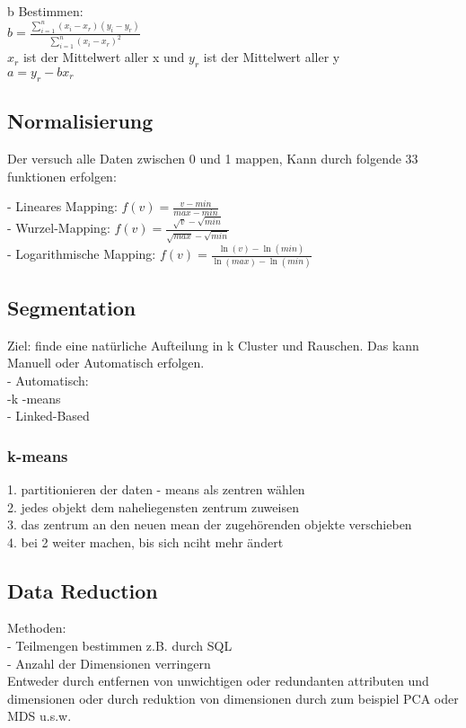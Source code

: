 \documentclass[a4paper]{scrartcl}
\begin{document}
b Bestimmen:\\
$b=\frac{\sum\limits^n_{i=1} (x_i - x_r)(y_i - y_r)}{\sum\limits^n_{i=1}(x_i - x_r)^2}$\\

$x_r$ ist der Mittelwert aller x und $y_r$ ist der Mittelwert aller y\\

$a=y_r - bx_r$\\

\subsection{Normalisierung}
Der versuch alle Daten zwischen 0 und 1 mappen, Kann durch folgende 33 funktionen erfolgen:

- Lineares Mapping: $f(v) = \frac{v-min}{max-min}$\\

- Wurzel-Mapping: $f(v) = \frac{\sqrt{v} - \sqrt{min}}{\sqrt{max}-\sqrt{min}}$\\

- Logarithmische Mapping: $f(v) = \frac{\ln(v)-\ln(min)}{\ln(max)-\ln(min)}$\\

\subsection{Segmentation}
Ziel: finde eine natürliche Aufteilung in k Cluster und Rauschen. Das kann Manuell oder Automatisch erfolgen.\\

- Automatisch:\\
 -k -means\\
 - Linked-Based\\
 
 \subsubsection{k-means}
 1. partitionieren der daten - means als zentren wählen\\
2. jedes objekt dem naheliegensten zentrum zuweisen\\
3. das zentrum an den neuen mean der zugehörenden objekte verschieben\\
4. bei 2 weiter machen, bis sich nciht mehr ändert\\

\subsection{Data Reduction}
Methoden:\\
- Teilmengen bestimmen z.B. durch SQL\\
- Anzahl der Dimensionen verringern\\
Entweder durch entfernen von unwichtigen oder redundanten attributen und dimensionen oder durch reduktion von dimensionen durch zum beispiel PCA oder MDS u.s.w.
\end{document}

